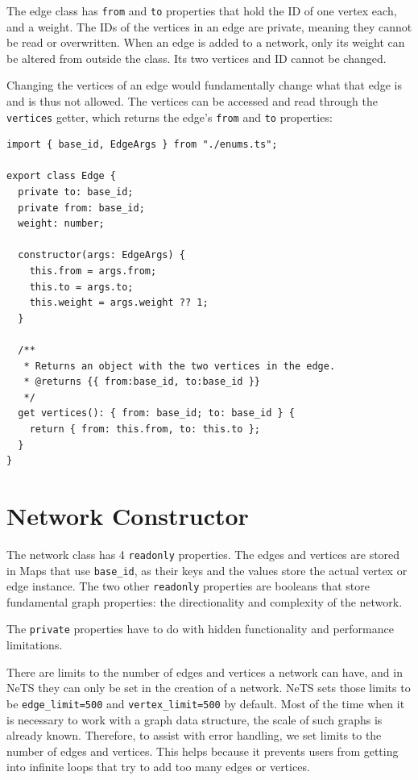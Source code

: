 The edge class has \texttt{from} and \texttt{to} properties that hold
the ID of one vertex each, and a weight.
The IDs of the vertices in an edge are private,
meaning they cannot be read or overwritten.
When an edge is added to a network, only its weight can be altered from outside the class.
Its two vertices and ID cannot be changed. 

Changing the vertices of an edge would fundamentally change what that edge is and is thus not allowed.
The vertices can be accessed and read through the \texttt{vertices} getter,
which returns the edge's \texttt{from} and \texttt{to} properties:

\begin{verbatim}
import { base_id, EdgeArgs } from "./enums.ts";

export class Edge {
  private to: base_id;
  private from: base_id;
  weight: number;

  constructor(args: EdgeArgs) {
    this.from = args.from;
    this.to = args.to;
    this.weight = args.weight ?? 1;
  }

  /**
   * Returns an object with the two vertices in the edge.
   * @returns {{ from:base_id, to:base_id }}
   */
  get vertices(): { from: base_id; to: base_id } {
    return { from: this.from, to: this.to };
  }
}
\end{verbatim}

\section{Network Constructor}

The network class has 4 \texttt{readonly} properties.
The edges and vertices are stored in Maps that use \texttt{base_id},
as their keys and the values store the actual vertex or edge instance.
The two other \texttt{readonly} properties are booleans that store fundamental graph properties:
the directionality and complexity of the network.

The \texttt{private} properties have to do with hidden functionality
and performance limitations.

There are limits to the number of edges and vertices a network can have,
and in NeTS they can only be set in the creation of a network.
NeTS sets those limits to be \texttt{edge_limit=500} and \texttt{vertex_limit=500}
by default.
Most of the time when it is necessary to work with a graph data structure,
the scale of such graphs is already known.
Therefore, to assist with error handling, we set limits to the number of edges and vertices.
This helps because it prevents users from getting into infinite loops that try to add
too many edges or vertices.


